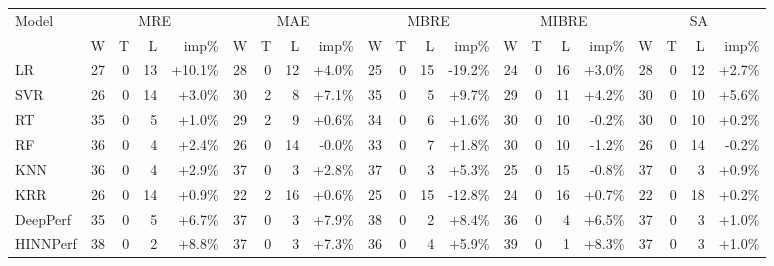 \begin{tabular}{lrrrrrrrrrrrrrrrrrrrr}
\toprule
Model & \multicolumn{4}{c}{MRE} & \multicolumn{4}{c}{MAE} & \multicolumn{4}{c}{MBRE} & \multicolumn{4}{c}{MIBRE} & \multicolumn{4}{c}{SA} \\
& W & T & L & imp\% & W & T & L & imp\% & W & T & L & imp\% & W & T & L & imp\% & W & T & L & imp\% \\
\midrule
LR & 27 & 0 & 13 & +10.1\% & 28 & 0 & 12 & +4.0\% & 25 & 0 & 15 & -19.2\% & 24 & 0 & 16 & +3.0\% & 28 & 0 & 12 & +2.7\% \\
SVR & 26 & 0 & 14 & +3.0\% & 30 & 2 & 8 & +7.1\% & 35 & 0 & 5 & +9.7\% & 29 & 0 & 11 & +4.2\% & 30 & 0 & 10 & +5.6\% \\
RT & 35 & 0 & 5 & +1.0\% & 29 & 2 & 9 & +0.6\% & 34 & 0 & 6 & +1.6\% & 30 & 0 & 10 & -0.2\% & 30 & 0 & 10 & +0.2\% \\
RF & 36 & 0 & 4 & +2.4\% & 26 & 0 & 14 & -0.0\% & 33 & 0 & 7 & +1.8\% & 30 & 0 & 10 & -1.2\% & 26 & 0 & 14 & -0.2\% \\
KNN & 36 & 0 & 4 & +2.9\% & 37 & 0 & 3 & +2.8\% & 37 & 0 & 3 & +5.3\% & 25 & 0 & 15 & -0.8\% & 37 & 0 & 3 & +0.9\% \\
KRR & 26 & 0 & 14 & +0.9\% & 22 & 2 & 16 & +0.6\% & 25 & 0 & 15 & -12.8\% & 24 & 0 & 16 & +0.7\% & 22 & 0 & 18 & +0.2\% \\
DeepPerf & 35 & 0 & 5 & +6.7\% & 37 & 0 & 3 & +7.9\% & 38 & 0 & 2 & +8.4\% & 36 & 0 & 4 & +6.5\% & 37 & 0 & 3 & +1.0\% \\
HINNPerf & 38 & 0 & 2 & +8.8\% & 37 & 0 & 3 & +7.3\% & 36 & 0 & 4 & +5.9\% & 39 & 0 & 1 & +8.3\% & 37 & 0 & 3 & +1.0\% \\
\bottomrule
\end{tabular}

